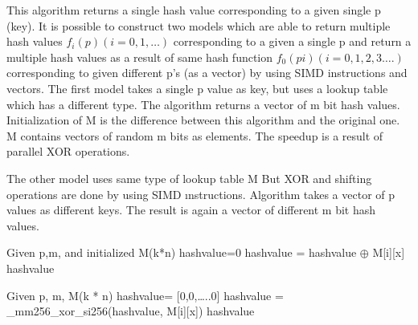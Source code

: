 \documentclass[a0,portrait]{a0poster}
\begin{document}
\begin{minipage}[c]{\linewidth}
\begin{framed}
\begin{multicols}{2}
%
This algorithm returns a single hash value corresponding to a given single p
(key). It is possible to construct two models which are able to return multiple hash
values $f_i(p)(i=0,1,…)$ corresponding to a given a single p and return a multiple
hash values as a result of same hash function $f_0 (p i ) (i=0,1,2,3….)$ corresponding
to given different p’s (as a vector) by using SIMD instructions and vectors.
The first model takes a single p value as key, but uses a lookup table which has a
different type. The algorithm returns a vector of m bit hash values. Initialization of
M is the difference between this algorithm and the original one. M contains
vectors of random m bits as elements. The speedup is a result of parallel XOR
operations.

The other model uses same type of lookup table M But XOR and shifting
operations are done by using SIMD ınstructions. Algorithm takes a vector of p
values as different keys. The result is again a vector of different m bit hash
values.
\begin{algorithm}[H]
\begin{algorithmic}
\State Given p,m, and initialized M(k*n)
\State hashvalue=0
\State hashvalue = hashvalue  $\oplus$ M[i][x]
\EndFor
\Return hashvalue

\EndFunction


\State Given p, m, M(k * n)
\State  hashvalue= [0,0,…..0]
\State hashvalue = \_mm256\_xor\_si256(hashvalue, M[i][x]) 
\EndFor
\Return hashvalue
\EndFunction

\end{algorithmic}
\end{algorithm}

\end{multicols}
\end{framed}
\end{minipage}
\end{document}
